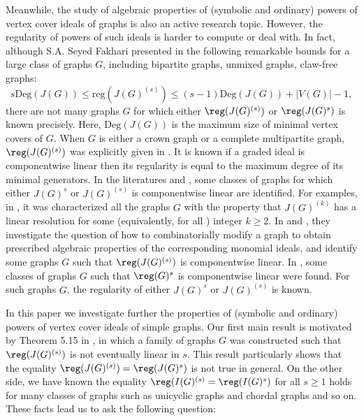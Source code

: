 \documentclass[12pt]{amsart}
\begin{document}
 Meanwhile, the study of algebraic properties of (symbolic  and ordinary) powers of vertex cover ideals of graphs is also an active research topic. However, the regularity of  powers of such ideals is harder to compute or deal with. In fact, although S.A. Seyed Fakhari presented in \cite{S} the following remarkable bounds for a large class of graphs $G$, including bipartite graphs, unmixed graphs, claw-free graphs: $$s\mathrm{Deg}(J(G))\leq \mathrm{reg}(J(G)^{(s)})\leq (s-1)\mathrm{Deg}(J(G))+|V(G)|-1,$$ there are not many graphs $G$ for which either $\reg(J(G)^{(s)})$ or $\reg(J(G)^{s})$ is known precisely.  Here, $\mathrm{Deg}(J(G))$ is the maximum size of minimal vertex covers of $G$. When $G$ is  either a crown graph or a complete multipartite graph,   $\reg(J(G)^{(s)})$  was explicitly given in \cite{KKSS}. It is known if a graded ideal is componentwise linear then its regularity is equal to the maximum degree of its minimal generators. In the literatures \cite{DHN,GHS,M,S,Sel} and \cite{S1},  some classes of graphs for which either $J(G)^s$ or $J(G)^{(s)}$ is componentwise linear are identified. For examples, in \cite{S1}, it was characterized all the graphs $G$ with the property that  $J(G)^{(k)}$ has a linear resolution for some (equivalently, for all ) integer $k\geq 2$. In \cite{DHN, GHS, Sel,S} and \cite{S1}, they investigate the question of how to combinatorially modify a graph  to obtain prescribed algebraic
properties of the corresponding monomial ideals,  and identify  some graphs $G$ such that $\reg(J(G)^{(s)})$ is componentwise linear. In \cite{M}, some classes of graphs $G$ such that $\reg(G)^s$ is componentwise linear were found. For such graphs $G$, the regularity of   either $J(G)^{s}$ or $J(G)^{(s)}$ is known.











In this paper we investigate further the  properties of (symbolic and ordinary) powers of vertex cover ideals of simple graphs. Our first main result is motivated  by Theorem 5.15 in \cite{DHN}, in which a family of graphs $G$ was constructed such that $\reg(J(G)^{(s)})$ is not eventually linear in $s$. This result particularly shows that the equality  $\reg(J(G)^{(s)})=\reg(J(G)^{s})$ is not true in general.  On the other side, we have known the equality  $\reg(I(G)^{(s)}= \reg(I(G)^s)$  for all $s\geq 1$ holds for many classes of graphs such as unicyclic graphs and chordal graphs and so on. These facts lead us to ask the following question:
\end{document}
